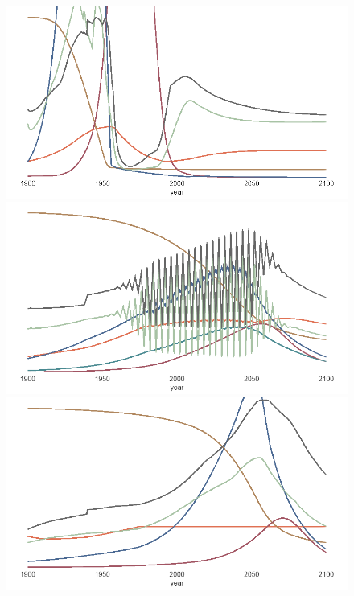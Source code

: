 \documentclass[10pt,a4paper]{scrartcl}
\begin{document}
\begin{figure}
\centering
\begin{minipage}{0.49\textwidth}
\includegraphics[width=\textwidth]{./plaatjes/output-consumed-0,01.png}
\end{minipage}
\begin{minipage}{0.49\textwidth}
\includegraphics[width=\textwidth]{./plaatjes/timestep-2.png}
\end{minipage}
\begin{minipage}{0.49\textwidth}
\includegraphics[width=\textwidth]{./plaatjes/fixed-population.png}

\end{minipage}
\end{figure}
\end{document}
